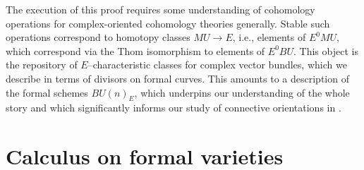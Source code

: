 The execution of this proof requires some understanding of cohomology operations for complex-oriented cohomology theories generally.  Stable such operations correspond to homotopy classes $MU \to E$, i.e., elements of $E^0 MU$, which correspond via the Thom isomorphism to elements of $E^0 BU$.  This object is the repository of $E$--characteristic classes for complex vector bundles, which we describe in terms of divisors on formal curves.  This amounts to a description of the formal schemes $BU(n)_E$, which underpins our understanding of the whole story and which significantly informs our study of connective orientations in .









\section{Calculus on formal varieties}\label{FormalVarietiesLecture}


